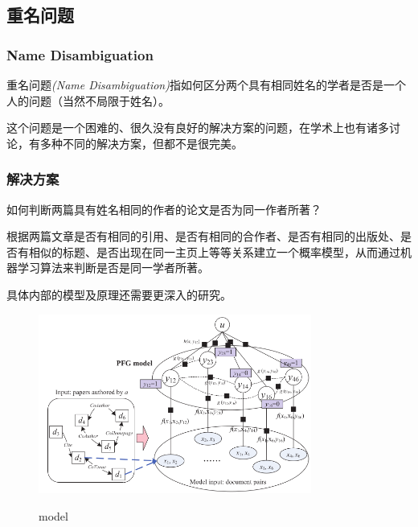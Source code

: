 \documentclass[UTF8]{ctexbeamer}
\begin{document}
\subsection{重名问题}
\begin{frame}
    \frametitle{Name Disambiguation}

    重名问题\textit{(Name Disambiguation)}指如何区分两个具有相同姓名的学者是否是一个人的问题（当然不局限于姓名）。

    这个问题是一个困难的、很久没有良好的解决方案的问题，在学术上也有诸多讨论，有多种不同的解决方案，但都不是很完美。

\end{frame}

\begin{frame}[allowframebreaks]
    \frametitle{解决方案}

    如何判断两篇具有姓名相同的作者的论文是否为同一作者所著？

    根据两篇文章是否有相同的引用、是否有相同的合作者、是否有相同的出版处、是否有相似的标题、是否出现在同一主页上等等关系建立一个概率模型，从而通过机器学习算法来判断是否是同一学者所著。\cite{wang2011adana}

    具体内部的模型及原理还需要更深入的研究。

    \begin{figure}[h]
        \caption{model}
        \centering
        \includegraphics[width=0.8\textwidth]{assets/figures/pfgmodel.PNG}
        \label{fig:pfgmodel}
    \end{figure}

\end{frame}
\end{document}
